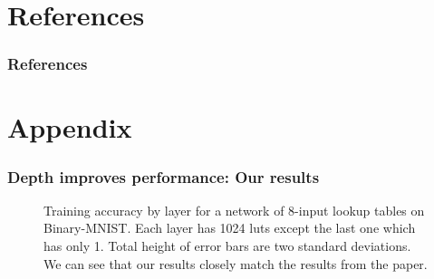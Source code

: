 \documentclass[pdflatex,compress]{beamer}
\begin{document}
\section{References}

\begin{frame}
\frametitle{References}
\printbibliography
\end{frame}

\section{Appendix}

\begin{frame}
	\frametitle{Depth improves performance: Our results}
	\begin{figure}
		\begin{minipage}[b]{.98\linewidth}
			\centering
				\begin{minipage}[b]{.48\linewidth}
				\centering
				
				\end{minipage}
				\begin{minipage}[b]{.48\linewidth}
				\centering
				
				\end{minipage}
		\end{minipage}
		\caption*{\tiny Training accuracy by layer for a network of 8-input lookup tables on Binary-MNIST. Each layer has 1024 luts except the last one which has only 1. Total height of error bars are two standard deviations. We can see that our results closely match the results from the paper.}
	\end{figure}
\end{frame}
\end{document}
